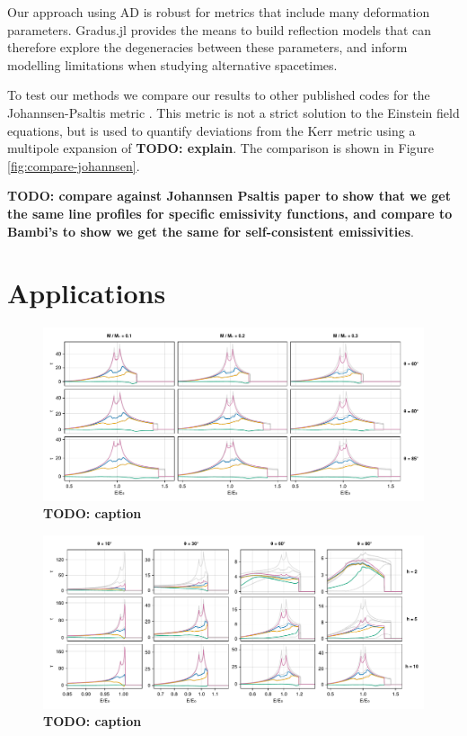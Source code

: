 \documentclass[fleqn,usenatbib]{mnras}
\newcommand{\todo}[1]{{\noindent \bf \color{red} TODO: #1}}
\newcommand{\Gradus}{Gradus.jl }
\begin{document}
Our approach using AD is robust for metrics that include many deformation
parameters. \Gradus provides the means to build reflection models that can
therefore explore the degeneracies between these parameters, and inform
modelling limitations when studying alternative spacetimes.

To test our methods we compare our results to other published codes for the
Johannsen-Psaltis metric \cite{johannsen_regular_2013}. This metric is not a
strict solution to the Einstein field equations, but is used to quantify
deviations from the Kerr metric using a multipole expansion of \todo{explain}.
The comparison is shown in Figure \ref{fig:compare-johannsen}.

\todo{compare against Johannsen Psaltis paper to show that we get the same line profiles for specific emissivity functions, and compare to Bambi's to show we get the same for self-consistent emissivities}.

\section{Applications}
\label{sec:applications}

\begin{figure}
	\centering
	\includegraphics[width=0.99\linewidth]{figures/reverberation.thick-disc.pdf}
    \caption{\todo{caption}}
	\label{fig:reverb-thick-discs}
\end{figure}

\begin{figure}
	\centering
	\includegraphics[width=0.99\linewidth]{figures/reverberation.thick-disc-corona.pdf}
    \caption{\todo{caption}}
	\label{fig:reverb-thick-discs}
\end{figure}
\end{document}
